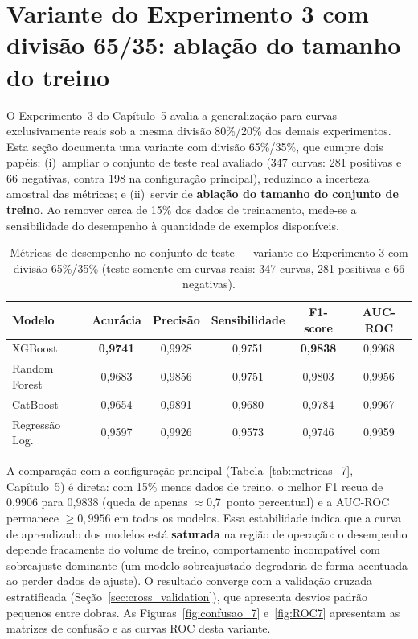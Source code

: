 \documentclass[msc]{on} %
\begin{document}
\section{Variante do Experimento 3 com divisão 65/35: ablação do tamanho do treino}
\label{sec:exp3_6535}

O Experimento~3 do Capítulo~5 avalia a generalização para curvas exclusivamente reais sob a mesma divisão 80\%/20\% dos demais experimentos. Esta seção documenta uma variante com divisão 65\%/35\%, que cumpre dois papéis: (i)~ampliar o conjunto de teste real avaliado (347 curvas: 281 positivas e 66 negativas, contra 198 na configuração principal), reduzindo a incerteza amostral das métricas; e (ii)~servir de \textbf{ablação do tamanho do conjunto de treino}. Ao remover cerca de 15\% dos dados de treinamento, mede-se a sensibilidade do desempenho à quantidade de exemplos disponíveis.

\begin{table}[htbp]
\centering
\caption{Métricas de desempenho no conjunto de teste --- variante do Experimento 3 com divisão 65\%/35\% (teste somente em curvas reais: 347 curvas, 281 positivas e 66 negativas).}
\label{tab:metricas_exp3_6535}
\begin{tabular}{lccccc}
\hline
\textbf{Modelo} & \textbf{Acurácia} & \textbf{Precisão} & \textbf{Sensibilidade} & \textbf{F1-score} & \textbf{AUC-ROC} \\
\hline
XGBoost         & \textbf{0,9741} & 0,9928 & 0,9751 & \textbf{0,9838} & 0,9968 \\
Random Forest   & 0,9683 & 0,9856 & 0,9751 & 0,9803 & 0,9956 \\
CatBoost        & 0,9654 & 0,9891 & 0,9680 & 0,9784 & 0,9967 \\
Regressão Log.  & 0,9597 & 0,9926 & 0,9573 & 0,9746 & 0,9959 \\
\hline
\end{tabular}
\end{table}

A comparação com a configuração principal (Tabela~\ref{tab:metricas_7}, Capítulo~5) é direta: com 15\% menos dados de treino, o melhor F1 recua de 0,9906 para 0,9838 (queda de apenas $\approx$0,7~ponto percentual) e a AUC-ROC permanece $\geq 0{,}9956$ em todos os modelos. Essa estabilidade indica que a curva de aprendizado dos modelos está \textbf{saturada} na região de operação: o desempenho depende fracamente do volume de treino, comportamento incompatível com sobreajuste dominante (um modelo sobreajustado degradaria de forma acentuada ao perder dados de ajuste). O resultado converge com a validação cruzada estratificada (Seção~\ref{sec:cross_validation}), que apresenta desvios padrão pequenos entre dobras. As Figuras~\ref{fig:confusao_7} e~\ref{fig:ROC7} apresentam as matrizes de confusão e as curvas ROC desta variante.
\end{document}
